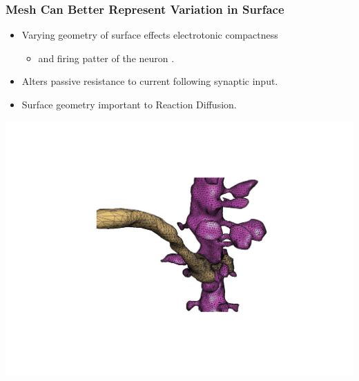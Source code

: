 \documentclass[notes=hide]{beamer}
\begin{document}
{\begin{frame}
\frametitle{Mesh Can Better Represent Variation in Surface}
\begin{itemize}

\item Varying geometry of surface effects electrotonic compactness
\begin{itemize}
\item and firing patter of the neuron \cite{mainen1996influence}.
\end{itemize}
\item Alters passive resistance to current following synaptic input.  
\vfill  
\item Surface geometry important to Reaction Diffusion.
\end{itemize}
\hfill
\includegraphics[scale=0.15]{spines2.png} \cite{edwards2014volrovern}


\end{frame}




}
\end{document}
